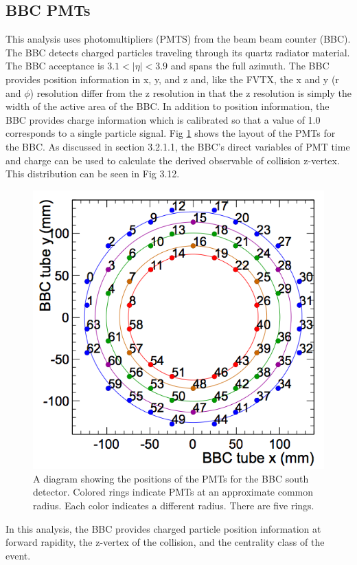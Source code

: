 \subsection{BBC PMTs}
This analysis uses photomultipliers (PMTS) from the beam beam counter (BBC). The BBC detects charged particles traveling through its quartz radiator material. The BBC acceptance is $3.1 < |\eta| < 3.9$ and spans the full azimuth. The BBC provides position information in x, y, and z and, like the FVTX, the x and y (r and $\phi$) resolution differ from the z resolution in that the z resolution is simply the width of the active area of the BBC. In addition to position information, the BBC provides charge information which is calibrated so that a value of 1.0 corresponds to a single particle signal. Fig \ref{fig:bbc_rings} shows the layout of the PMTs for the BBC. As discussed in section 3.2.1.1, the BBC's direct variables of PMT time and charge can be used to calculate the derived observable of collision z-vertex. This distribution can be seen in Fig 3.12. 
\begin{figure}[h!]
\begin{center}
\includegraphics[width=0.55\linewidth]{figs/bbc_rings.png}
\caption{A diagram showing the positions of the PMTs for the BBC south detector. Colored rings indicate PMTs at an approximate common radius. Each color indicates a different radius. There are five rings.}
\label{fig:bbc_rings}
\end{center}
\end{figure}

In this analysis, the BBC provides charged particle position information at forward rapidity, the z-vertex of the collision, and the centrality class of the event.




